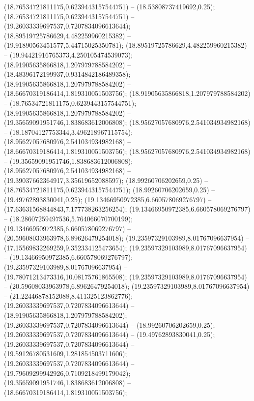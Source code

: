  (18.76534721811175,0.6239443157544751) -- (18.53808737419692,0.25);
 (18.76534721811175,0.6239443157544751) -- (19.26033339697537,0.7207834096613644);
 (18.89519725786629,4.482259960215382) -- (19.91890563451577,5.44715025350781);
 (18.89519725786629,4.482259960215382) -- (19.94421916765373,4.250105474539073);
 (18.91905635866818,1.207979788584202) -- (18.48396172199937,0.9314842186489358);
 (18.91905635866818,1.207979788584202) -- (18.66670319186414,1.819310051503756);
 (18.91905635866818,1.207979788584202) -- (18.76534721811175,0.6239443157544751);
 (18.91905635866818,1.207979788584202) -- (19.35659091951746,1.838683612006808);
 (18.95627057680976,2.541034934982168) -- (18.18704127753344,3.496218967115754);
 (18.95627057680976,2.541034934982168) -- (18.66670319186414,1.819310051503756);
 (18.95627057680976,2.541034934982168) -- (19.35659091951746,1.838683612006808);
 (18.95627057680976,2.541034934982168) -- (19.39037662364917,3.35619652088597);
 (18.99260706202659,0.25) -- (18.76534721811175,0.6239443157544751);
 (18.99260706202659,0.25) -- (19.49762893830041,0.25);
 (19.13466950972385,6.660578069276797) -- (17.63631568844843,7.177738263256254);
 (19.13466950972385,6.660578069276797) -- (18.28607259497536,5.764066070700199);
 (19.13466950972385,6.660578069276797) -- (20.59608033963978,6.89626479254018);
 (19.23597329103989,8.01767096637954) -- (17.15569832269259,9.352334125473654);
 (19.23597329103989,8.01767096637954) -- (19.13466950972385,6.660578069276797);
 (19.23597329103989,8.01767096637954) -- (19.78071213473316,10.08175761865508);
 (19.23597329103989,8.01767096637954) -- (20.59608033963978,6.89626479254018);
 (19.23597329103989,8.01767096637954) -- (21.22446878152088,8.411325123862776);
 (19.26033339697537,0.7207834096613644) -- (18.91905635866818,1.207979788584202);
 (19.26033339697537,0.7207834096613644) -- (18.99260706202659,0.25);
 (19.26033339697537,0.7207834096613644) -- (19.49762893830041,0.25);
 (19.26033339697537,0.7207834096613644) -- (19.59126780531609,1.281854503711606);
 (19.26033339697537,0.7207834096613644) -- (19.79609299942926,0.7109218499179042);
 (19.35659091951746,1.838683612006808) -- (18.66670319186414,1.819310051503756);
